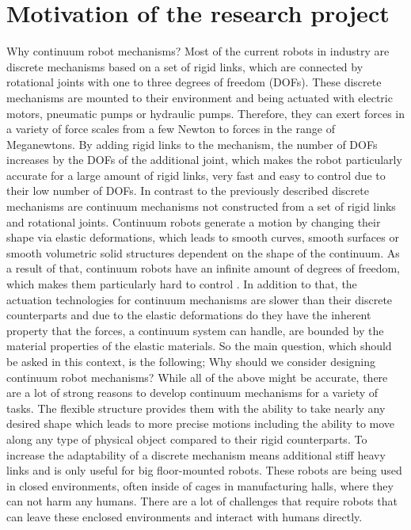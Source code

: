 \section{Motivation of the research project} \label{sec:motivation}
%
Why continuum robot mechanisms? Most of the current robots in industry are discrete mechanisms based on a set of rigid links, which are connected by rotational joints with one to three degrees of freedom (DOFs).
These discrete mechanisms are mounted to their environment and being actuated with electric motors, pneumatic pumps or hydraulic pumps. Therefore, they can exert forces in a 
variety of force scales from a few Newton to forces in the range of Meganewtons. By adding rigid links to the mechanism, the number of DOFs increases by the DOFs of the additional joint, which makes
the robot particularly accurate for a large amount of rigid links, very fast and easy to control due to their low number of DOFs. In contrast to the previously described discrete mechanisms are continuum mechanisms
 not constructed from a set of rigid links and rotational joints. Continuum robots generate a motion by changing their shape via elastic deformations, which leads to smooth curves,
 smooth surfaces or smooth volumetric solid structures dependent on the shape of the continuum. As a result of that, continuum robots have an infinite amount of degrees of freedom, which makes
 them particularly hard to control \cite{Robinson1999_conf}. In addition to that, the actuation technologies for continuum mechanisms are slower than their discrete counterparts and due to the 
 elastic deformations do they have the inherent property that the forces, a continuum system can handle, are bounded by the material properties of the elastic materials.
So the main question, which should be asked in this context, is the following;
Why should we consider designing continuum robot mechanisms?
%
While all of the above might be accurate, there are a lot of strong reasons to develop continuum mechanisms for a variety of tasks. The flexible structure provides them with the ability
to take nearly any desired shape which leads to more precise motions including the ability to move along any type of physical object compared to their rigid counterparts. To increase the
 adaptability of a discrete mechanism means additional stiff heavy links and is only useful for big floor-mounted robots. These robots are being used in closed environments,
often inside of cages in manufacturing halls, where they can not harm any humans. There are a lot of challenges that require robots that can leave these enclosed environments and interact with humans directly.
